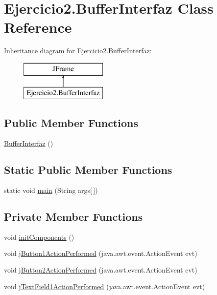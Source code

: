 \hypertarget{class_ejercicio2_1_1_buffer_interfaz}{}\section{Ejercicio2.\+Buffer\+Interfaz Class Reference}
\label{class_ejercicio2_1_1_buffer_interfaz}
Inheritance diagram for Ejercicio2.\+Buffer\+Interfaz\+:\begin{figure}[H]
\begin{center}
\leavevmode
\includegraphics[height=2.000000cm]{class_ejercicio2_1_1_buffer_interfaz}
\end{center}
\end{figure}
\subsection*{Public Member Functions}
\begin{DoxyCompactItemize}
\item 
\mbox{\hyperlink{class_ejercicio2_1_1_buffer_interfaz_a659117fee6f4a16a187bf9a637bbbad4}{Buffer\+Interfaz}} ()
\end{DoxyCompactItemize}
\subsection*{Static Public Member Functions}
\begin{DoxyCompactItemize}
\item 
static void \mbox{\hyperlink{class_ejercicio2_1_1_buffer_interfaz_a1ea4bdb4e29e185efd3ae018a11c0678}{main}} (String args\mbox{[}$\,$\mbox{]})
\end{DoxyCompactItemize}
\subsection*{Private Member Functions}
\begin{DoxyCompactItemize}
\item 
void \mbox{\hyperlink{class_ejercicio2_1_1_buffer_interfaz_a410934c1224871aae42d82ffacf5d624}{init\+Components}} ()
\item 
void \mbox{\hyperlink{class_ejercicio2_1_1_buffer_interfaz_a79e9c5884d7a271f4ea91c1807f846da}{j\+Button1\+Action\+Performed}} (java.\+awt.\+event.\+Action\+Event evt)
\item 
void \mbox{\hyperlink{class_ejercicio2_1_1_buffer_interfaz_af46612a912867d6c9824fbf28628ba1f}{j\+Button2\+Action\+Performed}} (java.\+awt.\+event.\+Action\+Event evt)
\item 
void \mbox{\hyperlink{class_ejercicio2_1_1_buffer_interfaz_aeb77802d30bd769d914d0cd86698582e}{j\+Text\+Field1\+Action\+Performed}} (java.\+awt.\+event.\+Action\+Event evt)
\end{DoxyCompactItemize}
